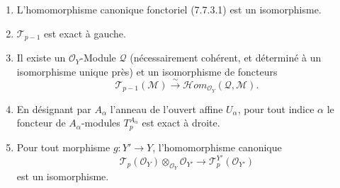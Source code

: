 \begin{theorem}[7.7.5]
\begin{enumerate}
  \item[a$''$)] L'homomorphisme canonique fonctoriel (7.7.3.1) est un
    isomorphisme.

  \item[b)] $\mathscr T_{p-1}$ est exact à gauche.

  \item[b$'$)] Il existe un $\mathscr O_Y$-Module $\mathscr Q$ (nécessairement
    cohérent, et déterminé à un isomorphisme unique près) et un isomorphisme de
    foncteurs
    \[
      \mathscr T_{p-1}(\mathscr M)
      \xrightarrow{\sim}
      \mathscr{H}\!om_{\mathscr O_Y}(\mathscr Q,\mathscr M).
      \tag{7.7.5.2}\label{III.7.7.5.2.fr}
    \]

  \item[c)] En désignant par $A_\alpha$ l'anneau de l'ouvert affine $U_\alpha$,
    pour tout indice $\alpha$ le foncteur de $A_\alpha$-modules
    $T_p^{A_\alpha}$ est exact à droite.

  \item[d)] Pour tout morphisme $g:Y'\to Y$, l'homomorphisme canonique
    \[
      \mathscr T_p(\mathscr O_Y)
      \otimes_{\mathscr O_Y}\mathscr O_{Y'}
      \longrightarrow
      \mathscr T_p^{Y'}(\mathscr O_{Y'})
      \tag{7.7.5.3}\label{III.7.7.5.3.fr}
    \]
    est un isomorphisme.
\end{enumerate}
\end{theorem}

